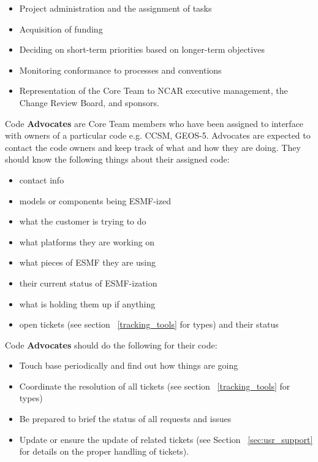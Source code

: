 \begin{itemize}
\item Project administration and the assignment of  tasks
\item Acquisition of funding
\item Deciding on short-term priorities based on longer-term objectives
\item Monitoring conformance to processes and conventions
\item Representation of the Core Team to NCAR executive management, the Change Review 
Board, and sponsors.
\end{itemize}

Code {\bf Advocates} are Core Team members who have been assigned to interface with owners of
a particular code e.g. CCSM, GEOS-5. Advocates are expected to contact the code owners and keep track of what and how they are doing. They should know the following things about their assigned code:

\begin{itemize}
\item contact info
\item models or components being ESMF-ized
\item what the customer is trying to do
\item what platforms they are working on
\item what pieces of ESMF they are using
\item their current status of ESMF-ization
\item what is holding them up if anything
\item open tickets (see section ~\ref{tracking_tools} for types) and their status
\end{itemize}

Code {\bf Advocates} should do the following for their code:
\begin{itemize}
\item Touch base periodically and find out how things are going
\item Coordinate the resolution of all tickets (see section ~\ref{tracking_tools} for types)
\item Be prepared to brief the status of all requests and issues
\item Update or ensure the update of related tickets (see Section ~\ref{sec:usr_support} for details on
the proper handling of tickets).
\end{itemize}

